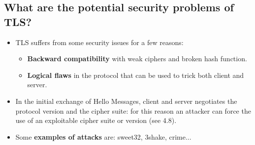 \documentclass[9pt, letterpaper]{article}
\begin{document}
\subsection{What are the potential security problems of TLS?}
\begin{itemize}
	\item TLS suffers from some security issues for a few reasons:
	      \begin{itemize}
		      \item \textbf{Backward compatibility} with weak ciphers and broken hash function.
		      \item \textbf{Logical flaws} in the protocol that can be used to trick both client and server.
	      \end{itemize}
	\item In the initial exchange of Hello Messages, client and server negotiates the protocol version and the cipher suite: for this reason an attacker can force the use of an exploitable cipher suite or version (see 4.8).
	\item Some \textbf{examples of attacks} are: sweet32, 3shake, crime...
\end{itemize}
\end{document}
